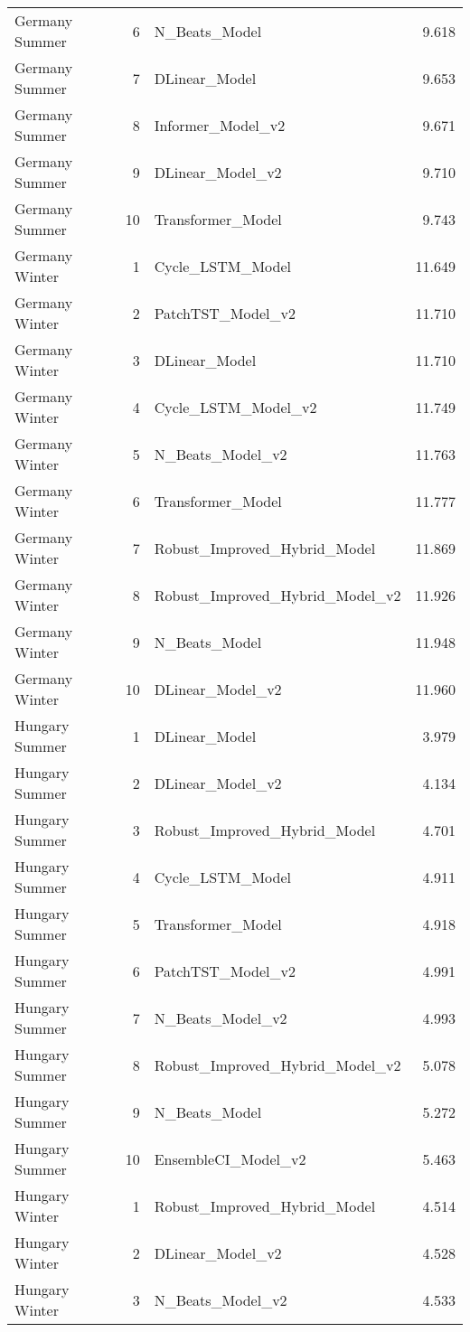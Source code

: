 \begin{longtable}{l r l r}
Germany Summer & 6 & N\_Beats\_Model & 9.618 \\
Germany Summer & 7 & DLinear\_Model & 9.653 \\
Germany Summer & 8 & Informer\_Model\_v2 & 9.671 \\
Germany Summer & 9 & DLinear\_Model\_v2 & 9.710 \\
Germany Summer & 10 & Transformer\_Model & 9.743 \\
Germany Winter & 1 & Cycle\_LSTM\_Model & 11.649 \\
Germany Winter & 2 & PatchTST\_Model\_v2 & 11.710 \\
Germany Winter & 3 & DLinear\_Model & 11.710 \\
Germany Winter & 4 & Cycle\_LSTM\_Model\_v2 & 11.749 \\
Germany Winter & 5 & N\_Beats\_Model\_v2 & 11.763 \\
Germany Winter & 6 & Transformer\_Model & 11.777 \\
Germany Winter & 7 & Robust\_Improved\_Hybrid\_Model & 11.869 \\
Germany Winter & 8 & Robust\_Improved\_Hybrid\_Model\_v2 & 11.926 \\
Germany Winter & 9 & N\_Beats\_Model & 11.948 \\
Germany Winter & 10 & DLinear\_Model\_v2 & 11.960 \\
Hungary Summer & 1 & DLinear\_Model & 3.979 \\
Hungary Summer & 2 & DLinear\_Model\_v2 & 4.134 \\
Hungary Summer & 3 & Robust\_Improved\_Hybrid\_Model & 4.701 \\
Hungary Summer & 4 & Cycle\_LSTM\_Model & 4.911 \\
Hungary Summer & 5 & Transformer\_Model & 4.918 \\
Hungary Summer & 6 & PatchTST\_Model\_v2 & 4.991 \\
Hungary Summer & 7 & N\_Beats\_Model\_v2 & 4.993 \\
Hungary Summer & 8 & Robust\_Improved\_Hybrid\_Model\_v2 & 5.078 \\
Hungary Summer & 9 & N\_Beats\_Model & 5.272 \\
Hungary Summer & 10 & EnsembleCI\_Model\_v2 & 5.463 \\
Hungary Winter & 1 & Robust\_Improved\_Hybrid\_Model & 4.514 \\
Hungary Winter & 2 & DLinear\_Model\_v2 & 4.528 \\
Hungary Winter & 3 & N\_Beats\_Model\_v2 & 4.533 \\

\end{longtable}
